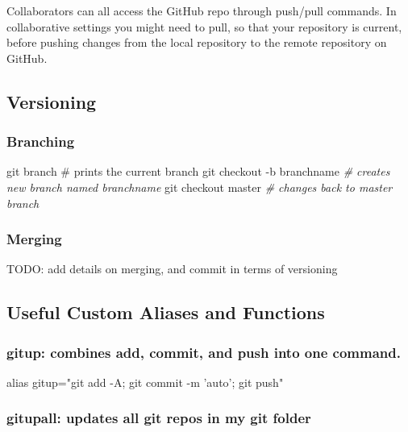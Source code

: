 \documentclass[]{article}
\newenvironment{Shaded}{\begin{snugshade}}{\end{snugshade}}
\newcommand{\StringTok}[1]{\textcolor[rgb]{0.31,0.60,0.02}{#1}}
\newcommand{\CommentTok}[1]{\textcolor[rgb]{0.56,0.35,0.01}{\textit{#1}}}
\newcommand{\FunctionTok}[1]{\textcolor[rgb]{0.00,0.00,0.00}{#1}}
\newcommand{\BuiltInTok}[1]{#1}
\newcommand{\NormalTok}[1]{#1}
\begin{document}
Collaborators can all access the GitHub repo through push/pull commands.
In collaborative settings you might need to pull, so that your
repository is current, before pushing changes from the local repository
to the remote repository on GitHub.

\subsection{Versioning}

\subsubsection{Branching}

\begin{Shaded}
\begin{Highlighting}[]
\FunctionTok{git}\NormalTok{ branch   # prints the current branch}
\FunctionTok{git}\NormalTok{ checkout -b branchname }\CommentTok{# creates new branch named branchname}
\FunctionTok{git}\NormalTok{ checkout master }\CommentTok{# changes back to master branch}
\end{Highlighting}
\end{Shaded}

\subsubsection{Merging}

TODO: add details on merging, and commit in terms of versioning

\subsection{Useful Custom Aliases and Functions}

\subsubsection{gitup: combines add, commit, and push into one command.}

\begin{Shaded}
\begin{Highlighting}[]
\BuiltInTok{alias}\NormalTok{ gitup=}\StringTok{"git add -A; git commit -m 'auto'; git push"}
\end{Highlighting}
\end{Shaded}

\subsubsection{gitupall: updates all git repos in my git folder}
\end{document}
